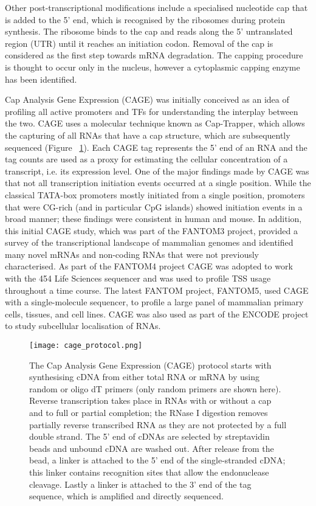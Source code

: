 Other post-transcriptional modifications include a specialised nucleotide cap that is added to the 5' end, which is recognised by the ribosomes during protein synthesis. The ribosome binds to the cap and reads along the 5' untranslated region (UTR) until it reaches an initiation codon. Removal of the cap is considered as the first step towards mRNA degradation. The capping procedure is thought to occur only in the nucleus, however a cytoplasmic capping enzyme has been identified\cite{pmid22921400}.

Cap Analysis Gene Expression (CAGE) was initially conceived as an idea of profiling all active promoters and TFs for understanding the interplay between the two\cite{carninci2010capanalysis}. CAGE uses a molecular technique known as Cap-Trapper\cite{pmid8938445,pmid9179497}, which allows the capturing of all RNAs that have a cap structure, which are subsequently sequenced (Figure ~\ref{fig:cage_protocol}). Each CAGE tag represents the 5' end of an RNA and the tag counts are used as a proxy for estimating the cellular concentration of a transcript, i.e. its expression level. One of the major findings made by CAGE was that not all transcription initiation events occurred at a single position\cite{pmid16645617}. While the classical TATA-box promoters mostly initiated from a single position, promoters that were CG-rich (and in particular CpG islands) showed initiation events in a broad manner; these findings were consistent in human and mouse\cite{pmid16645617}. In addition, this initial CAGE study, which was part of the FANTOM3 project, provided a survey of the transcriptional landscape of mammalian genomes and identified many novel mRNAs and non-coding RNAs that were not previously characterised\cite{pmid16141072}. As part of the FANTOM4 project CAGE was adopted to work with the 454 Life Sciences sequencer and was used to profile TSS usage throughout a time course. The latest FANTOM project, FANTOM5, used CAGE with a single-molecule sequencer, to profile a large panel of mammalian primary cells, tissues, and cell lines\cite{pmid24670764}. CAGE was also used as part of the ENCODE project to study subcellular localisation of RNAs\cite{pmid22955620}.

\begin{figure}[!ht]
   \centering
   \texttt{[image: cage\_protocol.png]}
   \caption[Cap Analysis Gene Expression protocol]{The Cap Analysis Gene Expression (CAGE) protocol starts with synthesising cDNA from either total RNA or mRNA by using random or oligo dT primers (only random primers are shown here). Reverse transcription takes place in RNAs with or without a cap and to full or partial completion; the RNase I digestion removes partially reverse transcribed RNA as they are not protected by a full double strand. The 5' end of cDNAs are selected by streptavidin beads and unbound cDNA are washed out. After release from the bead, a linker is attached to the 5' end of the single-stranded cDNA; this linker contains recognition sites that allow the endonuclease cleavage. Lastly a linker is attached to the 3' end of the tag sequence, which is amplified and directly sequenced.}
   \label{fig:cage_protocol}
\end{figure}

